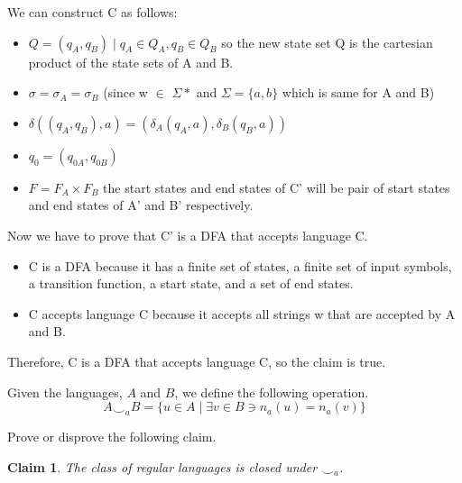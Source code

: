 \documentclass[addpoints]{exam}
\theoremstyle{claim}
\newtheorem{claim}{Claim}
\begin{document}
\begin{questions}
\begin{solution}
     We can construct C as follows:
    \begin{itemize}
      \item $Q = {(q_A, q_B) \mid q_A \in Q_A, q_B \in Q_B}$
      so the new state set Q is the cartesian product of the state sets of A and B.
      \item $\sigma = \sigma_A = \sigma_B$
      (since w $\in$ $\Sigma*$ and $\Sigma =\{a,b\}$ which is same for A and B)
      \item $\delta((q_A, q_B), a) = (\delta_A(q_A, a), \delta_B(q_B, a))$
      \item $q_0 = (q_{0A}, q_{0B})$
      \item $F = F_A \times F_B$
      the start states and end states of C' will be pair of start states and end states of A' and B' respectively.
    \end{itemize}
    Now we have to prove that C' is a DFA that accepts language C.
    \begin{itemize}
      \item C is a DFA because it has a finite set of states, a finite set of input symbols, a transition function, a start state, and a set of end states.
      \item C accepts language C because it accepts all strings w that are accepted by A and B.
    \end{itemize}
    Therefore, C is a DFA that accepts language C, so the claim is true.  

  \end{solution}
  
\question[35] Given the languages, $A$ and $B$, we define the following operation.
  \[
    A\smile_a B = \{ u\in A \mid \exists v\in B \ni n_a(u) = n_a(v) \}
  \]

  Prove or disprove the following claim.
  \begin{claim}
    The class of regular languages is closed under $\smile_a$.
  \end{claim}

  \begin{solution}
    
  \end{solution}
\end{questions}
\end{document}
